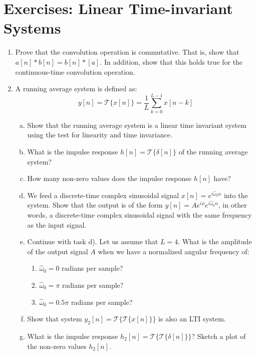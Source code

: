 \newpage
\section{Exercises: Linear Time-invariant Systems}
\begin{enumerate}

\item Prove that the convolution operation is commutative. That is, show that $a[n]*b[n]=b[n]*[a]$. In addition, show that this holds true for the continuous-time convolution operation. 

\item A running average system is defined as:
  \begin{equation}
    y[n] = \mathcal{T}\{x[n]\} = \frac{1}{L}\sum_{k=0}^{L-1} x[n-k]
  \end{equation}

  \begin{enumerate}[a)]
    \item Show that the running average system is a linear time
      invariant system using the test for linearity and time
      invariance.
    \item What is the impulse response $h[n] =
      \mathcal{T}\{\delta[n]\}$ of the running average system?
    \item How many non-zero values does the impulse response $h[n]$ have?
    \item We feed a discrete-time complex sinusoidal signal
      $x[n]=e^{i\hat{\omega}_0 n}$ into the system. Show that the
      output is of the form $y[n]=A e^{i\phi} e^{i\hat{\omega}_0 n}$,
      in other words, a discrete-time complex sinusoidal signal with
      the same frequency as the input signal.
      \item Continue with task d). Let us assume that
        $L=4$. What is the amplitude of the output signal $A$ when we
        have a normalized angular frequency of:
        \begin{enumerate}
        \item $\hat{\omega}_0 = 0$ radians per sample?
        \item $\hat{\omega}_0 = \pi$ radians per sample?
        \item $\hat{\omega}_0 = 0.5\pi$ radians per sample?          
        \end{enumerate}
      
    \item Show that system $y_2[n]=\mathcal{T}\{ \mathcal{T}\{x[n]\} \}$ is also an LTI system.
    \item What is the impulse response $h_2[n]=\mathcal{T}\{\mathcal{T}\{\delta[n]\}\}$? Sketch a plot of the non-zero values $h_2[n]$.
  \end{enumerate}
  

\end{enumerate}
